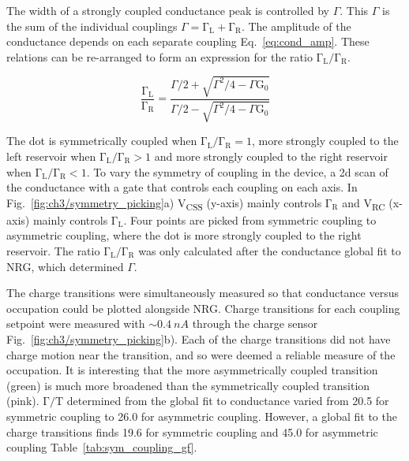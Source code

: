 The width of a strongly coupled conductance peak is controlled by $\Gamma$. This $\Gamma$ is the sum of the individual couplings $\Gamma=\mathrm{\Gamma_L} + \mathrm{\Gamma_R}$. The amplitude of the conductance depends on each separate coupling Eq.~\ref{eq:cond_amp}. These relations can be re-arranged to form an expression for the ratio $\mathrm{\Gamma_L}/\mathrm{\Gamma_R}$.


\begin{equation}\label{eq:cond_ratio}
  \frac{\mathrm{\Gamma_L}}{\mathrm{\Gamma_R}} = 
  \frac
  {\Gamma/2 + \sqrt{\Gamma^2/4 - \Gamma\mathrm{G_0}}}
  {\Gamma/2 - \sqrt{\Gamma^2/4 - \Gamma\mathrm{G_0}}}
\end{equation}

The dot is symmetrically coupled when $\mathrm{\Gamma_L}/\mathrm{\Gamma_R} = 1$, more strongly coupled to the left reservoir when $\mathrm{\Gamma_L}/\mathrm{\Gamma_R} > 1$ and more strongly coupled to the right reservoir when $\mathrm{\Gamma_L}/\mathrm{\Gamma_R} < 1$. To vary the symmetry of coupling in the device, a 2d scan of the conductance with a gate that controls each coupling on each axis.  In Fig.~\ref{fig:ch3/symmetry_picking}a) V\textsubscript{CSS} (y-axis) mainly controls $\mathrm{\Gamma_R}$ and  V\textsubscript{RC} (x-axis) mainly controls $\mathrm{\Gamma_L}$. Four points are picked from symmetric coupling to asymmetric coupling, where the dot is more strongly coupled to the right reservoir. The ratio $\mathrm{\Gamma_L}/\mathrm{\Gamma_R}$ was only calculated after the conductance global fit to NRG, which determined $\Gamma$. 

The charge transitions were simultaneously measured so that conductance versus occupation could be plotted alongside NRG. Charge transitions for each coupling setpoint were measured with $\sim\qty{0.4}{nA}$ through the charge sensor Fig.~\ref{fig:ch3/symmetry_picking}b). Each of the charge transitions did not have charge motion near the transition, and so were deemed a reliable measure of the occupation. It is interesting that the more asymmetrically coupled transition (green) is much more broadened than the symmetrically coupled transition (pink). $\mathrm{\Gamma/T}$ determined from the global fit to conductance varied from 20.5 for symmetric coupling to 26.0 for asymmetric coupling. However, a global fit to the charge transitions finds 19.6 for symmetric coupling and 45.0 for asymmetric coupling Table~\ref{tab:sym_coupling_gf}. 

